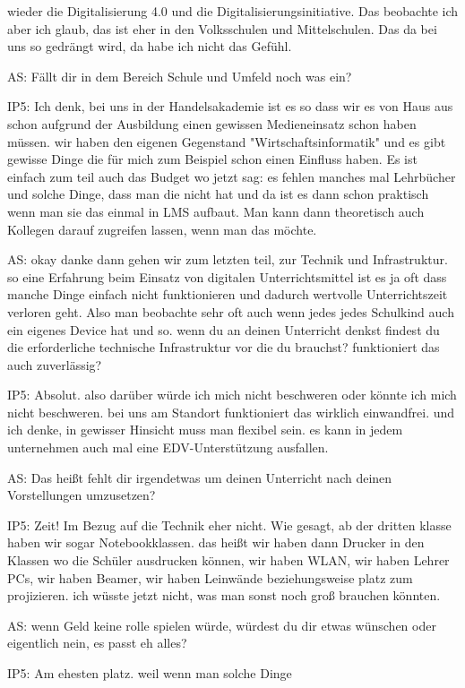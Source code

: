 \documentclass[fontsize=11pt,paper=a4]{scrbook}
\begin{document}
{\begin{itemize*}
wieder die Digitalisierung 4.0 und die Digitalisierungsinitiative. Das beobachte ich aber ich glaub, das ist eher in den Volksschulen und Mittelschulen. Das da bei uns so gedrängt wird, da habe ich nicht das Gefühl.
\item[AS:] Fällt dir in dem Bereich Schule und Umfeld noch was ein?
\item[IP5:] Ich denk, bei uns in der Handelsakademie ist es so
dass wir es von Haus aus schon aufgrund
der Ausbildung einen gewissen Medieneinsatz schon haben müssen. wir haben den eigenen Gegenstand "Wirtschaftsinformatik" und es gibt gewisse Dinge die für mich zum Beispiel schon einen Einfluss haben. Es ist einfach zum teil
auch das Budget wo jetzt sag: es fehlen
manches mal Lehrbücher und solche Dinge, dass man die nicht hat und da ist es dann schon praktisch
wenn man sie das einmal in LMS aufbaut. Man kann dann theoretisch auch Kollegen darauf zugreifen lassen, wenn man das
möchte.
\item[AS:] okay danke dann gehen wir zum letzten
teil, zur Technik und Infrastruktur. so
eine Erfahrung beim Einsatz von digitalen Unterrichtsmittel ist es ja oft dass
manche Dinge einfach nicht funktionieren
und dadurch wertvolle Unterrichtszeit
verloren geht. Also man beobachte sehr oft auch wenn jedes jedes Schulkind auch ein
eigenes Device hat und so. wenn du an
deinen Unterricht denkst findest du die
erforderliche technische Infrastruktur
vor
die du brauchst? funktioniert das
auch zuverlässig?
\item[IP5:] Absolut.  also darüber würde ich
mich nicht beschweren oder könnte ich mich
nicht beschweren. bei uns am Standort funktioniert das wirklich einwandfrei.
und ich denke, in gewisser Hinsicht
muss man flexibel sein. es kann in jedem
unternehmen auch mal eine EDV-Unterstützung ausfallen.
\item[AS:] Das heißt fehlt dir irgendetwas um deinen Unterricht nach
deinen Vorstellungen umzusetzen?
\item[IP5:] Zeit! Im Bezug auf die Technik eher nicht. Wie gesagt, ab der dritten klasse
haben wir sogar Notebookklassen.
das heißt wir haben dann Drucker in den
Klassen wo die Schüler ausdrucken können,
wir haben WLAN, 
wir haben Lehrer PCs, wir haben Beamer, wir haben Leinwände beziehungsweise
platz zum projizieren.
ich wüsste jetzt nicht, was man sonst noch
groß brauchen könnten.
\item[AS:] wenn Geld keine rolle spielen würde, würdest du dir etwas
wünschen oder eigentlich nein, es passt eh alles?
\item[IP5:] Am ehesten platz. weil wenn man solche Dinge

\end{itemize*}}
\end{document}
